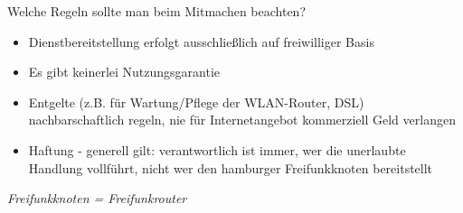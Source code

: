 \documentclass[aspectratio=43]{beamer}
\begin{document}
\begin{frame}{Welche Regeln sollte man beim Mitmachen beachten?}
	\begin{itemize}
		\item Dienstbereitstellung erfolgt ausschließlich auf freiwilliger Basis
		\item Es gibt keinerlei Nutzungsgarantie
		\item Entgelte (z.B. für Wartung/Pflege der WLAN-Router, DSL) nachbarschaftlich regeln, nie für Internetangebot kommerziell Geld verlangen
		\item Haftung - generell gilt: verantwortlich ist immer, wer die unerlaubte Handlung vollführt, nicht wer den hamburger Freifunkknoten bereitstellt
	\end{itemize}
	\it{Freifunkknoten = Freifunkrouter} %
\end{frame}
\end{document}
